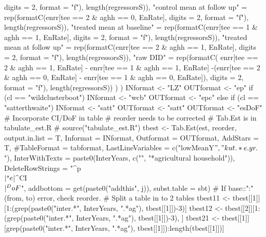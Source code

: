 \begin{Schunk}
\begin{Sinput}
{{{{{{{                         digits = 2, format = "f"), length(regressorsS)),
                     "control mean at follow up" = 
                       rep(formatC(enrr[tee == 2 & aghh == 0, EnRate], 
                         digits = 2, format = "f"), length(regressorsS)),
                     "treated mean at baseline" =
                       rep(formatC(enrr[tee == 1 & aghh == 1, EnRate], 
                         digits = 2, format = "f"), length(regressorsS)),
                     "treated mean at follow up" =
                       rep(formatC(enrr[tee == 2 & aghh == 1, EnRate], 
                         digits = 2, format = "f"), length(regressorsS)),
                     "raw DID" =
                       rep(formatC(
                       enrr[tee == 2 & aghh == 1, EnRate] - enrr[tee == 1 & aghh == 1, EnRate] 
                       -(enrr[tee == 2 & aghh == 0, EnRate] - enrr[tee == 1 & aghh == 0, EnRate]), 
                         digits = 2, format = "f"), length(regressorsS))
                   )
                )
                INformat <- "LZ"
                OUTformat <- "ep"
                if (cl == "wildclusterboot") {
                  INformat <- "wcb"
                  OUTformat <- "epc"
                } else if (cl == "satterthwaite") {
                  INformat <- "satt"
                  OUTformat <- "satt"
                  OUTformat <- "esDoF"
                }
                # Incorporate CI/DoF in table
                # reorder needs to be corrected
                # Tab.Est is in tabulate_est.R
                # source("tabulate_est.R")
                tbest <- Tab.Est(est, reorder, output.in.list = T,
                  Informat = INformat, Outformat = OUTformat, 
                  AddStars = T, #TableFormat = tabformat,
                  LastLineVariables = c("lowMeanY$", "kut.*e.yr.$"),
                  InterWithTexts = paste0(InterYears, c("", "*agricultural household")),
                  DeleteRowStrings = "^p\\$|^se\\$|^CI\\$|^DoF\\$",
                  addbottom = get(paste0("addthis", j)), subst.table = sbt)
                  # If base::":"(from, to) error, check reorder.
                # Split a table in to 2 tables
                tbest11 <- tbest[[1]][1:(grep(paste0("inter.*", InterYears, ".*ag"), tbest[[1]])-3)]
                tbest12 <- tbest[[2]][1:(grep(paste0("inter.*", InterYears, ".*ag"), tbest[[1]])-3), ]
                tbest21 <- tbest[[1]][grep(paste0("inter.*", InterYears, ".*ag"), tbest[[1]]):length(tbest[[1]])]
}}}}}}}
\end{Sinput}
\end{Schunk}

